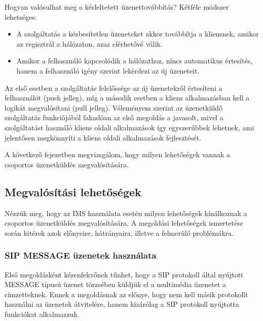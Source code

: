 Hogyan valósulhat meg a késleltetett üzenettovábbítás? Kétféle módszer lehetséges:

\begin{itemize}\itemsep1pt
\item	A szolgáltatás a kézbesítetlen üzeneteket akkor továbbítja a kliensnek, amikor az regisztrál a hálózaton, azaz elérhetővé válik.
\item Amikor a felhasználó kapcsolódik a hálózathoz, nincs automatikus értesítés, hanem a felhasználó igény szerint lekérdezi az új üzeneteit.
\end{itemize} 

Az első esetben a szolgáltatás felelőssége az új üzenetekről értesíteni a felhasználót (push jelleg), míg a második esetben a kliens alkalmazásban kell a logikát megvalósítani (pull jelleg). Véleményem szerint az üzenetküldő szolgáltatás funkciójából fakadóan az első megoldás a javasolt, mivel a szolgáltatást használó kliens oldali alkalmazások így egyszerűbbek lehetnek, ami jelentősen megkönnyíti a kliens oldali alkalmazások fejlesztését.

A következő fejezetben megvizsgálom, hogy milyen lehetőségek vannak a csoportos üzenetküldés megvalósítására.

\subsection{Megvalósítási lehetőségek}

Nézzük meg, hogy az IMS használata esetén milyen lehetőségek kínálkoznak a csoportos üzenetküldés megvalósítására. A megoldási lehetőségek ismertetése során kitérek azok előnyeire, hátrányaira, illetve a felmerülő problémákra.

\subsubsection{SIP MESSAGE üzenetek használata}
\label{sec:sip_message}

Első megoldásként kézenfekvőnek tűnhet, hogy a SIP protokoll által nyújtott MESSAGE típusú üzenet törzsében küldjük el a multimédia üzenetet a címzetteknek. Ennek a megoldásnak az előnye, hogy nem kell másik protokollt használni az üzenetek átvitelére, hanem kizárólag a SIP protokoll nyújtotta funkciókat alkalmazzuk. 

